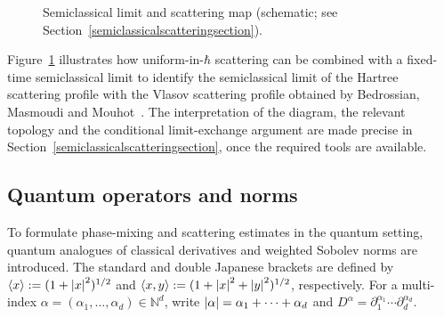 \documentclass[JEP,XML,SOM,Unicode]{cedram}
\theoremstyle{plain}
\theoremstyle{remark}
\newcommand{\p}{\partial}
\newcommand{\jb}[1]{\langle#1\rangle}
\begin{document}
\begin{figure}[ht]
\vspace{0cm}
\centering
{}
\captionsetup{width=.8\linewidth}
\caption{Semiclassical limit and scattering map (schematic; see Section~\ref{semiclassicalscatteringsection}).}
\label{map}
\end{figure}
Figure~\ref{map} illustrates how uniform-in-$\hbar$ scattering can be combined with a fixed-time semiclassical limit to identify the semiclassical limit of the Hartree scattering profile with the Vlasov scattering profile obtained by Bedrossian, Masmoudi and Mouhot~\cite{BedrossianMasmoudiMouhot2018}. The interpretation of the diagram, the relevant topology and the conditional limit-exchange argument are made precise in Section~\ref{semiclassicalscatteringsection}, once the required tools are available.

\subsection{Quantum operators and norms} To formulate phase-mixing and scattering estimates in the quantum setting, quantum analogues of classical derivatives and weighted Sobolev norms are introduced. The standard and double Japanese brackets are defined by $\jb{x}:=(1+\abs{x}^2)^{1/2}$ and $\jb{x,y}:=(1+\abs{x}^2+\abs{y}^2)^{1/2}$, respectively. For a multi-index $\alpha=(\alpha_1,\dots,\alpha_d)\in\mathbb N^d$, write
$\abs{\alpha}=\alpha_1+\dots+\alpha_d$ and $D^{\alpha}=\p_1^{\alpha_1}\cdots\p_d^{\alpha_d}$.
\end{document}
